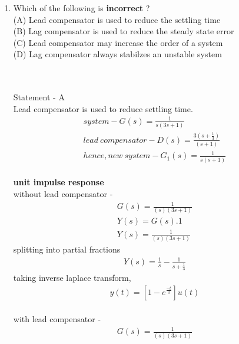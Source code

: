 \begin{enumerate}[label=\thesection.\arabic*.,ref=\thesection.\theenumi]
\item Which of the following is \textbf{incorrect} ?\\
(A) Lead compensator is used to reduce the settling time\\
(B) Lag compensator is used to reduce the steady state error\\
(C) Lead compensator may increase the order of a system\\
(D) Lag compensator always stabilzes an unstable system\\
\\
\solution 
\begin{figure}[h]
\begin{center}
\resizebox{\columnwidth}{!}{}
\end{center}
\end{figure}
\\
Statement - A\\Lead compensator is used to reduce settling time.
\begin{align}
system-G(s) = \frac{1}{s(3s+1)}\\
lead\ compensator-D(s) = \frac{3(s+\frac{1}{3})}{(s+1)} \\
hence, new\ system-G_{1}(s) = \frac{1}{s(s+1)}
\end{align}
\\
\textbf{unit impulse response}\\
without lead compensator - \\
\begin{align}
G(s) = \frac{1}{(s)(3s+1)}\\
Y(s) = G(s).1\\
Y(s) = \frac{1}{(s)(3s+1)}
\end{align}
splitting into partial fractions\\
\begin{align}
Y(s) = \frac{1}{s} - \frac{1}{s+\frac{1}{3}}
\end{align}
taking inverse laplace transform, \\
\begin{align}
y(t) = [ 1 - e^{\frac{-t}{3}}]u(t)
\end{align}
\\
with lead compensator - \\
\begin{align}
G(s) = \frac{1}{(s)(3s+1)}\\

\end{align}
\end{enumerate}

